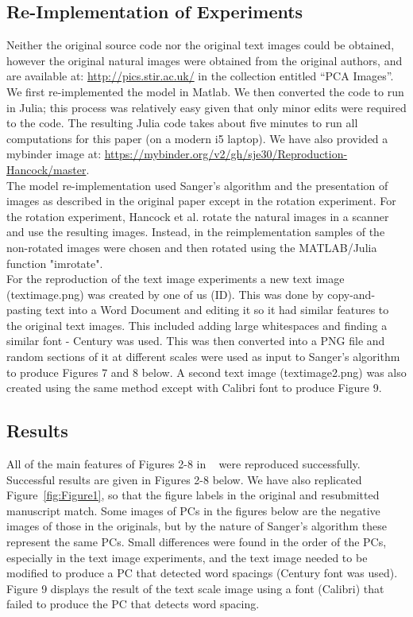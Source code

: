 \subsection{Re-Implementation of Experiments}

Neither the original source code nor the original text images could be obtained, however the original natural images were obtained from the original authors, and are available at: \url{http://pics.stir.ac.uk/} in the collection entitled
``PCA Images''. We first re-implemented the model in Matlab.  We then converted the code to
run in Julia; this process was relatively easy given that only minor
edits were required to the code.  The resulting Julia code takes about
five minutes to run all computations for this paper (on a modern i5
laptop).  We have also provided a mybinder image at:
\url{https://mybinder.org/v2/gh/sje30/Reproduction-Hancock/master}.\\
The model re-implementation used Sanger's algorithm and the presentation of images as described in the original paper except in the rotation experiment. For the rotation experiment, Hancock et al. rotate the natural images in a scanner and use the resulting images. Instead, in the reimplementation samples of the non-rotated images were chosen and then rotated using the MATLAB/Julia function "imrotate".\\
For the reproduction of the text image experiments a new text image (textimage.png) was created by one of us (ID). This was done by copy-and-pasting text into a Word Document and editing it so it had similar features to the original text images. This included adding large whitespaces and finding a similar font - Century was used. This was then converted into a PNG file and random sections of it at different scales were used as input to Sanger's algorithm to produce Figures 7 and 8 below. A second text image (textimage2.png) was also created using the same method except with Calibri font to produce Figure 9.

\subsection{Results}
All of the main features of Figures 2-8 in ~\cite{Hancock1991-mp} were reproduced successfully. Successful results are given in Figures 2-8 below. We have also replicated Figure~\ref{fig:Figure1}, so that the figure labels in the original and resubmitted manuscript match.  Some images of PCs in the figures below are the negative images of those in the originals, but by the nature of Sanger's algorithm these represent the same PCs. Small differences were found in the order of the PCs, especially in the text image experiments, and the text image needed to be modified to produce a PC that detected word spacings (Century font was used). Figure 9 displays the result of the text scale image using a font (Calibri) that failed to produce the PC that detects word spacing.



